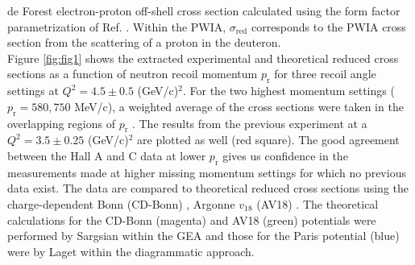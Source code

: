 de Forest \cite{DEFOREST1983} electron-proton off-shell cross section calculated using the form factor parametrization of Ref. \cite{PhysRevC.69.022201}.
Within the PWIA, $\sigma_{\mathrm{red}}$ corresponds to the PWIA cross section from the scattering of a proton in the deuteron. \\
\indent Figure \ref{fig:fig1} shows the extracted experimental and theoretical reduced cross sections as a function of neutron recoil momentum
$p_{\mathrm{r}}$ for three recoil angle settings at $Q^{2}=4.5\pm0.5$ (GeV/c)$^{2}$. For the two highest momentum settings ($p_{\mathrm{r}}=580, 750$ MeV/c), a weighted average of the cross sections were taken in the overlapping regions of $p_{\mathrm{r}}$ . The results from the previous experiment \cite{PhysRevLett.107.262501} at a $Q^{2}=3.5\pm0.25$ (GeV/c)$^{2}$ are plotted as well (red square). The good agreement between the Hall A and C data at lower $p_{\mathrm{r}}$
gives us confidence in the measurements made at higher missing momentum settings for which no previous data exist.
The data are compared to theoretical reduced
cross sections using the charge-dependent Bonn (CD-Bonn) \cite{PhysRevC.63.024001}, Argonne $v_{18}$ (AV18) \cite{PhysRevC.51.38}\DIFdelbegin {}\DIFdelend \DIFaddbegin {}\DIFaddend . The theoretical calculations
for the CD-Bonn (magenta) and AV18 (green) potentials were performed by Sargsian \cite{PhysRevC.82.014612} within the GEA and those for the Paris potential (blue) were by Laget \cite{LAGET2005} within the diagrammatic approach.
\DIFaddbegin {}\DIFaddend \\
